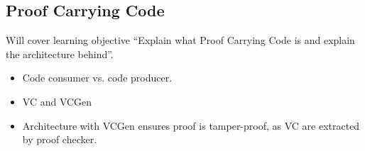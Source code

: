 \subsection{Proof Carrying Code}
\label{subsec:proof_carrying_code}

Will cover learning objective ``Explain what Proof Carrying Code is and explain the architecture behind''.

\begin{itemize}
\item 
Code consumer vs. code producer.
\item VC and VCGen
  \item Architecture with VCGen ensures proof is tamper-proof, as VC are extracted by proof checker.
\end{itemize}



